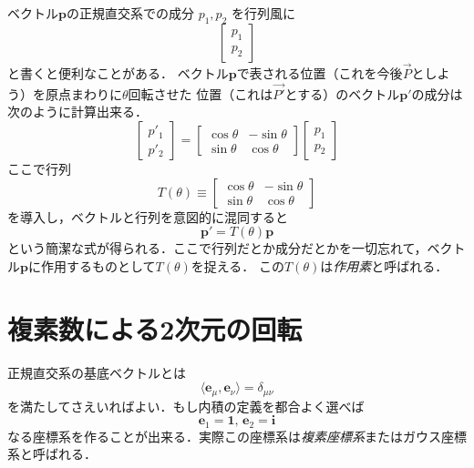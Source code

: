 \documentclass{jsbook}
\newcommand{\keyword}[1]{\emph{#1}}
\newcommand{\one}{\mathbf{1}}
\newcommand{\im}{\mathbf{i}}
\newcommand{\bvec}[1]{\boldsymbol{#1}}
\begin{document}
ベクトル$\bvec{p}$の正規直交系での成分 $p_1,p_2$ を行列風に
\begin{equation}
\begin{bmatrix}p_1\\p_2\end{bmatrix}
\end{equation}
と書くと便利なことがある．
ベクトル$\bvec{p}$で表される位置（これを今後$\vec{P}$としよう）を原点まわりに$\theta$回転させた
位置（これは$\vec{P'}$とする）のベクトル$\bvec{p}'$の成分は次のように計算出来る．
\begin{equation}
\begin{bmatrix}p'_1\\p'_2\end{bmatrix}=\begin{bmatrix}\cos\theta&-\sin\theta\\\sin\theta&\cos\theta\end{bmatrix}\begin{bmatrix}p_1\\p_2\end{bmatrix}
\end{equation}
%
%
ここで行列
\begin{equation}
T(\theta)\equiv\begin{bmatrix}\cos\theta&-\sin\theta\\\sin\theta&\cos\theta\end{bmatrix}
\end{equation}
を導入し，ベクトルと行列を意図的に混同すると
\begin{equation}
\bvec{p}'=T(\theta)\bvec{p}
\end{equation}
という簡潔な式が得られる．ここで行列だとか成分だとかを一切忘れて，ベクトル$\bvec{p}$に作用するものとして$T(\theta)$を捉える．
この$T(\theta)$は\keyword{作用素}と呼ばれる．

\section{複素数による2次元の回転}

正規直交系の基底ベクトルとは
\begin{equation}
\langle\bvec{e}_\mu,\bvec{e}_\nu\rangle=\delta_{\mu\nu}
\end{equation}
を満たしてさえいればよい．もし内積の定義を都合よく選べば
\begin{equation}
\bvec{e}_1=\one,\,\bvec{e}_2=\im
\end{equation}
なる座標系を作ることが出来る．実際この座標系は\keyword{複素座標系}またはガウス座標系と呼ばれる．
\end{document}
